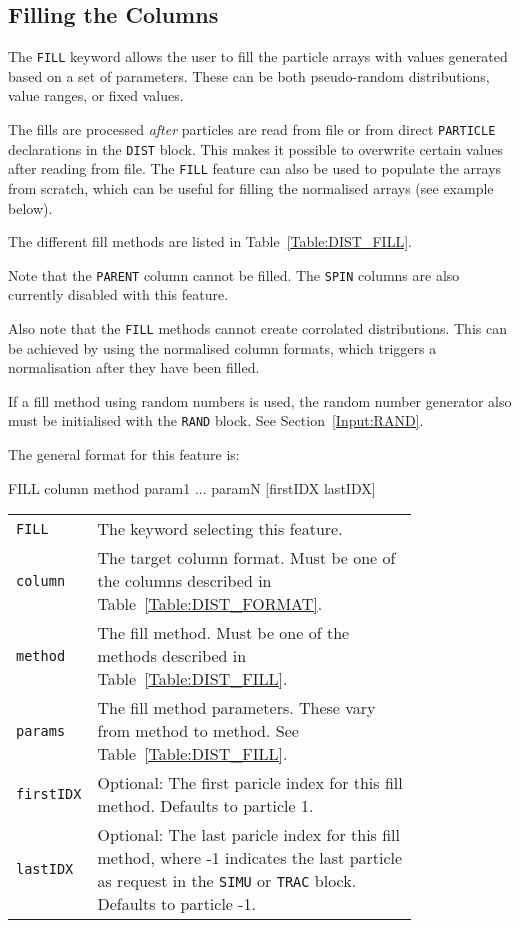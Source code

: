 \subsection{Filling the Columns}

The \texttt{FILL} keyword allows the user to fill the particle arrays with values generated based on a set of parameters.
These can be both pseudo-random distributions, value ranges, or fixed values.

The fills are processed \emph{after} particles are read from file or from direct \texttt{PARTICLE} declarations in the \texttt{DIST} block.
This makes it possible to overwrite certain values after reading from file.
The \texttt{FILL} feature can also be used to populate the arrays from scratch, which can be useful for filling the normalised arrays (see example below).

The different fill methods are listed in Table~\ref{Table:DIST_FILL}.

Note that the \texttt{PARENT} column cannot be filled.
The \texttt{SPIN} columns are also currently disabled with this feature.

Also note that the \texttt{FILL} methods cannot create corrolated distributions.
This can be achieved by using the normalised column formats, which triggers a normalisation after they have been filled.

If a fill method using random numbers is used, the random number generator also must be initialised with the \texttt{RAND} block. See Section~\ref{Input:RAND}.

\bigskip
\noindent The general format for this feature is:
\begin{cverbatim}
FILL column method param1 ... paramN [firstIDX lastIDX]
\end{cverbatim}

\begin{tabular}{@{}lp{0.8\linewidth}}
    \texttt{FILL}     & The keyword selecting this feature. \\
    \texttt{column}   & The target column format. Must be one of the columns described in Table~\ref{Table:DIST_FORMAT}. \\
    \texttt{method}   & The fill method. Must be one of the methods described in Table~\ref{Table:DIST_FILL}. \\
    \texttt{params}   & The fill method parameters. These vary from method to method. See Table~\ref{Table:DIST_FILL}. \\
    \texttt{firstIDX} & Optional: The first paricle index for this fill method. Defaults to particle 1. \\
    \texttt{lastIDX}  & Optional: The last paricle index for this fill method, where -1 indicates the last particle as request in the \texttt{SIMU} or \texttt{TRAC} block. Defaults to particle -1.
\end{tabular}

